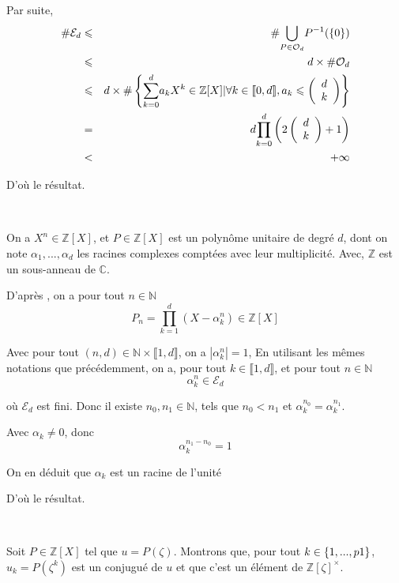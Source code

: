Par suite,
\begin{eqnarray*}
  \#\mathcal{E}_d & \leqslant & \# \underset{P \in \mathcal{O}_d}{\bigcup}
  P^{- 1} (\{ 0 \})\\
  & \leqslant & d \times \#\mathcal{O}_d\\
  & \leqslant & d \times \# \left\{ \underset{k = 0}{\overset{d}{\sum}} a_k
  X^k \in \mathbb{Z} [X]  | \nobracket \forall k \in \llbracket 0, d
  \rrbracket, a_k \leqslant \left( \begin{array}{c}
    d\\
    k
  \end{array} \right) \right\}\\
  & = & d \underset{k = 0}{\overset{d}{\prod}} \left( 2 \left(
  \begin{array}{c}
    d\\
    k
  \end{array} \right) + 1 \right)\\
  & < & + \infty
\end{eqnarray*}


D'o{\`u} le r{\'e}sultat.

\

 On a $X^n \in \mathbb{Z} [X]$, et $P \in \mathbb{Z} [X]$
est un polyn{\^o}me unitaire de degr{\'e} $d$, dont on note $\alpha_1, . . .,
\alpha_d$ les racines complexes compt{\'e}es avec leur multiplicit{\'e}. Avec,
$\mathbb{Z}$ est un sous-anneau de $\mathbb{C}$.

D'apr{\`e}s , on a pour tout $n \in
\mathbb{N}$
\[ P_n = \underset{k = 1}{\overset{d}{\prod}} (X - \alpha_k^n) \in \mathbb{Z}
   [X] \]


Avec pour tout $(n, d) \in \mathbb{N} \times \llbracket 1, d \rrbracket$, on a
$| \alpha_k^n | = 1$, En utilisant les m{\^e}mes notations que
pr{\'e}c{\'e}demment, on a, pour tout $k \in \llbracket 1, d \rrbracket$, et
pour tout $n \in \mathbb{N}$
\[ \alpha_k^n \in \mathcal{E}_d \]


o{\`u} $\mathcal{E}_d$ est fini. Donc il existe $n_0, n_1 \in \mathbb{N}$,
tels que $n_0 < n_1$ et $\alpha_k^{n_0} = \alpha_k^{n_1}$.

Avec $\alpha_k  \neq 0$, donc
\[ \alpha_k^{n_1 - n_0} = 1 \]


On en d{\'e}duit que $\alpha_k $ est un racine de l'unit{\'e}

D'o{\`u} le r{\'e}sultat.

\

 Soit $P \in \mathbb{Z}[X]$ tel que $u = P (\zeta)$. Montrons
que, pour tout $k \in \{1, . . ., p \nonconverted{minus} 1\}$, $u_k = P
(\zeta^k)$ est un conjugu{\'e} de $u$ et que c'est un {\'e}l{\'e}ment de
$\mathbb{Z}[\zeta]^{\times}$.

